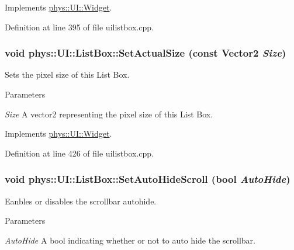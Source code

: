 Implements \hyperlink{classphys_1_1UI_1_1Widget_acba334c000c21f477238e961cd3ab2ce}{phys::UI::Widget}.



Definition at line 395 of file uilistbox.cpp.

\hypertarget{classphys_1_1UI_1_1ListBox_abb26f02d8ab44b9ebd6add14a9ba809c}{
\subsubsection[{SetActualSize}]{\setlength{\rightskip}{0pt plus 5cm}void phys::UI::ListBox::SetActualSize (const {\bf Vector2} {\em Size})}}
\label{d0/d28/classphys_1_1UI_1_1ListBox_abb26f02d8ab44b9ebd6add14a9ba809c}


Sets the pixel size of this List Box. 


\begin{DoxyParams}{Parameters}
\item[{\em Size}]A vector2 representing the pixel size of this List Box. \end{DoxyParams}


Implements \hyperlink{classphys_1_1UI_1_1Widget_a8c942355474d0b250dfadd4dac4ae400}{phys::UI::Widget}.



Definition at line 426 of file uilistbox.cpp.

\hypertarget{classphys_1_1UI_1_1ListBox_a60fc5c1907df6d83217b25c2c8f15f48}{
\subsubsection[{SetAutoHideScroll}]{\setlength{\rightskip}{0pt plus 5cm}void phys::UI::ListBox::SetAutoHideScroll (bool {\em AutoHide})}}
\label{d0/d28/classphys_1_1UI_1_1ListBox_a60fc5c1907df6d83217b25c2c8f15f48}


Eanbles or disables the scrollbar autohide. 


\begin{DoxyParams}{Parameters}
\item[{\em AutoHide}]A bool indicating whether or not to auto hide the scrollbar. \end{DoxyParams}


